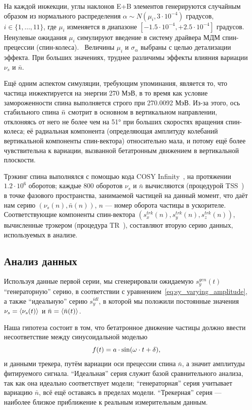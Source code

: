 На каждой инжекции, углы наклонов E+B элементов генерируются случайным образом из
нормального распределения ${\alpha\sim N(\mu_i, 3\cdot 10^{-4})}$ градусов, ${i\in\{1,\dots,11\}}$, где
$\mu_i$ изменяется в диапазоне ${[-1.5\cdot10^{-4}, +2.5\cdot10^{-4}]}$ градусов. Ненулевые ожидания $\mu_i$
симулируют введение в систему драйвера МДМ спин-прецессии (спин-колеса).~\cite{Koop:SpinWheel2015} 
Величины $\mu_i$ и $\sigma_{\alpha}$ выбраны с целью детализации эффекта. 
При больших значениях, труднее различимы эффекты влияния вариации
$\nu_s$ и $\bar n$.

Ещё одним аспектом симуляции, требующим упоминания, является то, что частица инжектируется на энергии 270 МэВ, в то время как условие замороженности спина выполняется строго при 270.0092 МэВ. Из-за этого, ось стабильного спина $\bar n$ смотрит в основном в вертикальном направлении, отклоняясь от него не более чем на \ang{51} при больших скоростях вращения спин-колеса; её радиальная компонента (определяющая амплитуду колебаний вертикальной компоненты спин-вектора) относительно мала, и потому ещё более чувствительна к вариации, вызванной бетатронным движением в вертикальной плоскости.

Трэкинг спина выполнялся с помощью кода COSY Infinity~\cite{COSYINF:Website}, на протяжении $1.2\cdot10^6$
оборотов; каждые 800 оборотов $\nu_s$ и $\bar n$ вычисляются (процедурой
TSS~\cite[стр.~41]{COSYINF:Manual:BeamPhys}) в точке фазового пространства, занимаемой частицей на данный момент,
что даёт нам серию ${(\nu_s(n), \bar n(n))}$, $n$ --- номер оборота частицы в ускорителе.
Соответствующие компоненты спин-вектора ${(s_x^{trk}(n), s_y^{trk}(n), s_z^{trk}(n))}$,
вычисленные трэкером (процедура TR~\cite[стр.~41]{COSYINF:Manual:BeamPhys}), составляют вторую серию данных,
используемых в анализе.

\subsection{Анализ данных}
Используя данные первой серии, мы сгенерировали ожидаемую $s_y^{gen}(t)$ ``генераторную'' серию,
в соответствии с уравнением~\eqref{eq:sy_varying_amplitude}, а также ``идеальную'' серию $s_y^{idl}$, в которой
мы положили постоянные значения ${\nu_s = \avg{\nu_s(t)}}$ и ${\bar n =\avg{\bar n(t)}}$. 

Наша гипотеза состоит в том, что бетатронное движение частицы
должно ввести несоответствие между синусоидальной моделью
\begin{equation}
  f(t) = a\cdot\sin(\omega\cdot t + \delta),\label{eq:fit_model}
\end{equation}
и данными трекера, путём вариации оси прецессии спина $\bar n$, а значит амплитуды
фитируемого сигнала. ``Идеальная'' серия служит базой сравнительного анализа,
так как она идеально соответствует модели; ``генераторная'' серия учитывает вариацию $\bar n$,
всё ещё оставаясь в пределах модели. ``Трекерная'' серия --- наиболее близкое приближение
к реальным измерительным данным.

